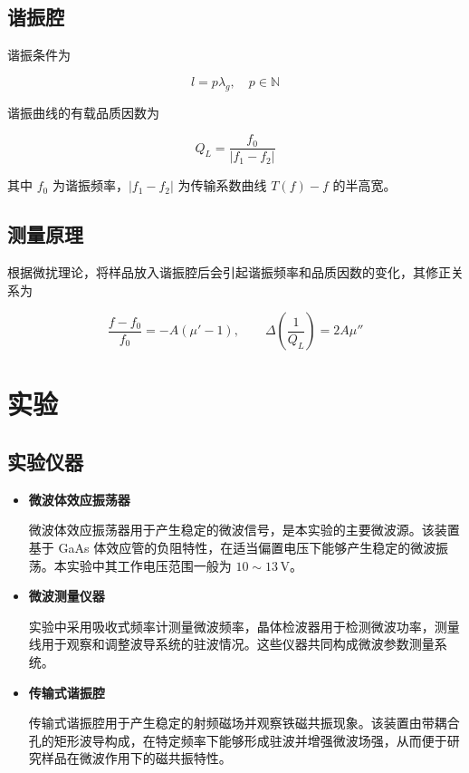 \documentclass[a4paper, 1.5lines]{ctexart}
\begin{document}
\subsection{谐振腔}

谐振条件为

\begin{equation}
l = p\lambda_g , \quad p\in\mathbb{N}
\end{equation}

谐振曲线的有载品质因数为

\begin{equation}
Q_L = \frac{f_0}{|f_1 - f_2|}
\end{equation}

其中 $f_0$ 为谐振频率，$|f_1-f_2|$ 为传输系数曲线 $T(f)-f$ 的半高宽。

\subsection{测量原理}

根据微扰理论，将样品放入谐振腔后会引起谐振频率和品质因数的变化，其修正关系为

\begin{equation}
\frac{f-f_0}{f_0} = -A(\mu'-1), \qquad
\Delta\left(\frac{1}{Q_L}\right) = 2A\mu''
\end{equation}

    \section{实验}

    \subsection{实验仪器}

\begin{itemize}

\item \textbf{微波体效应振荡器}

微波体效应振荡器用于产生稳定的微波信号，是本实验的主要微波源。该装置基于 GaAs 体效应管的负阻特性，在适当偏置电压下能够产生稳定的微波振荡。本实验中其工作电压范围一般为 $10\sim13\,\text{V}$。

\item \textbf{微波测量仪器}

实验中采用吸收式频率计测量微波频率，晶体检波器用于检测微波功率，测量线用于观察和调整波导系统的驻波情况。这些仪器共同构成微波参数测量系统。

\item \textbf{传输式谐振腔}

传输式谐振腔用于产生稳定的射频磁场并观察铁磁共振现象。该装置由带耦合孔的矩形波导构成，在特定频率下能够形成驻波并增强微波场强，从而便于研究样品在微波作用下的磁共振特性。

\end{itemize}
\end{document}
